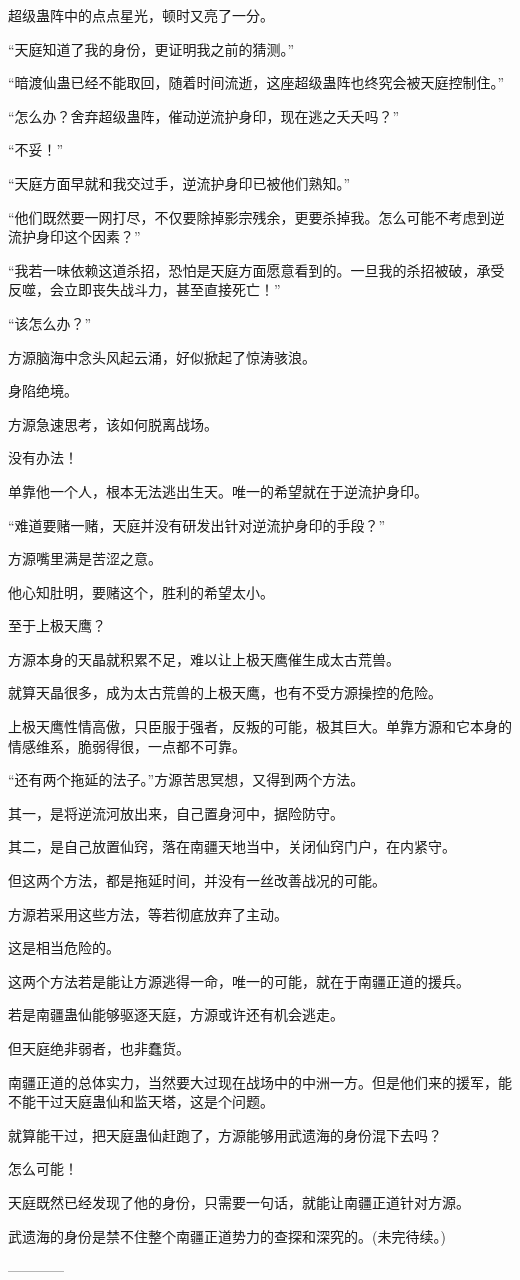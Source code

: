 \begin{this_body}
超级蛊阵中的点点星光，顿时又亮了一分。

“天庭知道了我的身份，更证明我之前的猜测。”

“暗渡仙蛊已经不能取回，随着时间流逝，这座超级蛊阵也终究会被天庭控制住。”

“怎么办？舍弃超级蛊阵，催动逆流护身印，现在逃之夭夭吗？”

“不妥！”

“天庭方面早就和我交过手，逆流护身印已被他们熟知。”

“他们既然要一网打尽，不仅要除掉影宗残余，更要杀掉我。怎么可能不考虑到逆流护身印这个因素？”

“我若一味依赖这道杀招，恐怕是天庭方面愿意看到的。一旦我的杀招被破，承受反噬，会立即丧失战斗力，甚至直接死亡！”

“该怎么办？”

方源脑海中念头风起云涌，好似掀起了惊涛骇浪。

身陷绝境。

方源急速思考，该如何脱离战场。

没有办法！

单靠他一个人，根本无法逃出生天。唯一的希望就在于逆流护身印。

“难道要赌一赌，天庭并没有研发出针对逆流护身印的手段？”

方源嘴里满是苦涩之意。

他心知肚明，要赌这个，胜利的希望太小。

至于上极天鹰？

方源本身的天晶就积累不足，难以让上极天鹰催生成太古荒兽。

就算天晶很多，成为太古荒兽的上极天鹰，也有不受方源操控的危险。

上极天鹰性情高傲，只臣服于强者，反叛的可能，极其巨大。单靠方源和它本身的情感维系，脆弱得很，一点都不可靠。

“还有两个拖延的法子。”方源苦思冥想，又得到两个方法。

其一，是将逆流河放出来，自己置身河中，据险防守。

其二，是自己放置仙窍，落在南疆天地当中，关闭仙窍门户，在内紧守。

但这两个方法，都是拖延时间，并没有一丝改善战况的可能。

方源若采用这些方法，等若彻底放弃了主动。

这是相当危险的。

这两个方法若是能让方源逃得一命，唯一的可能，就在于南疆正道的援兵。

若是南疆蛊仙能够驱逐天庭，方源或许还有机会逃走。

但天庭绝非弱者，也非蠢货。

南疆正道的总体实力，当然要大过现在战场中的中洲一方。但是他们来的援军，能不能干过天庭蛊仙和监天塔，这是个问题。

就算能干过，把天庭蛊仙赶跑了，方源能够用武遗海的身份混下去吗？

怎么可能！

天庭既然已经发现了他的身份，只需要一句话，就能让南疆正道针对方源。

武遗海的身份是禁不住整个南疆正道势力的查探和深究的。(未完待续。)

------------

\end{this_body}

